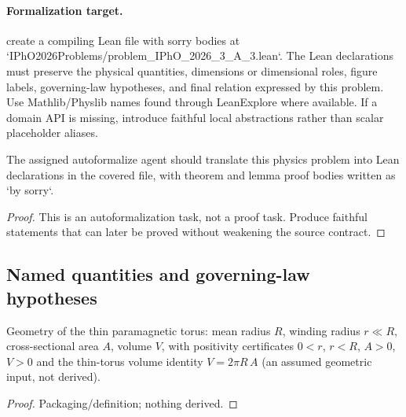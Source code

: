 \paragraph{Formalization target.}
create a compiling Lean file with sorry bodies at `IPhO2026Problems/problem\_IPhO\_2026\_3\_A\_3.lean`.
The Lean declarations must preserve the physical quantities, dimensions or dimensional roles, figure labels, governing-law hypotheses, and final relation expressed by this problem.
Use Mathlib/Physlib names found through LeanExplore where available. If a domain API is missing, introduce faithful local abstractions rather than scalar placeholder aliases.

\begin{theorem}
\label{thm:physics:IPhO_2026_3_A_3:target}
The assigned autoformalize agent should translate this physics problem into Lean declarations in the covered file, with theorem and lemma proof bodies written as `by sorry`.
\end{theorem}
\begin{proof}
This is an autoformalization task, not a proof task. Produce faithful statements that can later be proved without weakening the source contract.
\end{proof}

\subsection*{Named quantities and governing-law hypotheses}

\begin{definition}
\label{def:IPhO2026Problems_problem_IPhO_2026_3_A_3:PmTTorus}
Geometry of the thin paramagnetic torus: mean radius $R$, winding radius
$r \ll R$, cross-sectional area $A$, volume $V$, with positivity
certificates $0 < r$, $r < R$, $A > 0$, $V > 0$ and the thin-torus volume
identity $V = 2\pi R\,A$ (an assumed geometric input, not derived).
\end{definition}
\begin{proof}
Packaging/definition; nothing derived.
\end{proof}

